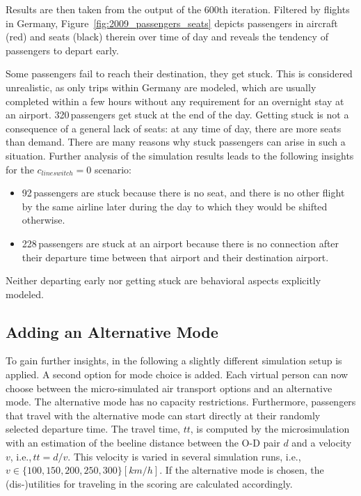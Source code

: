 Results are then taken from the output of the 600th iteration. 
Filtered by flights in Germany, Figure~\ref{fig:2009_passengers_seats} depicts passengers in aircraft (red) and seats (black) therein over time of day
and reveals the tendency of passengers to depart early. 

Some passengers fail to reach their destination, they get stuck.   
This is considered unrealistic, as only trips within Germany are modeled, which are usually completed within a few hours without any requirement for an overnight stay at an airport. 
320\,passengers get stuck at the end of the day. 
Getting stuck is not a consequence of a general lack of seats: at any time of day, there are more seats than demand.  
%
There are many reasons why stuck passengers can arise in such a situation.
%
Further analysis of the simulation results leads to the following insights for the $c_{lineswitch} = 0$ scenario:
\begin{itemize}
\item 92\,passengers are stuck because there is no seat, and there is no other flight by the same airline later during the day to which they would be shifted otherwise.
\item 228\,passengers are stuck at an airport because there is no connection after their departure time 
	between that airport and their destination airport. 
\end{itemize}

Neither departing early nor getting stuck are behavioral aspects explicitly modeled.  

\subsection{Adding an Alternative Mode}
To gain further insights, in the following a slightly different simulation setup is applied. 
A second option for mode choice is added. 
Each virtual person can now choose between the micro-simulated air transport options and an alternative mode. 
The alternative mode has no capacity restrictions. 
Furthermore, passengers that travel with the alternative mode can start directly at their randomly selected departure time. 
The travel time, $tt$, is computed by the microsimulation with an estimation of the beeline distance between the O-D pair $d$ and a velocity $v$, i.e.,\,$tt = d / v$.  
This velocity is varied in several simulation runs, i.e.,\,$v \in \{100, 150, 200, 250, 300 \} [km/h]$. 
If the alternative mode is chosen, the (dis-)utilities for traveling in the scoring are calculated accordingly.  

